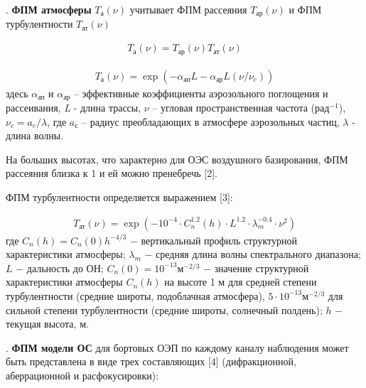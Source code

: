  . \textbf{ФПМ атмосферы} $T_\textit{а}(\nu)$ учитывает ФПМ рассеяния $T_\textit{ар}(\nu)$ и ФПМ турбулентности $T_\textit{ат}(\nu)$

\begin{equation}
	\label{eq:p2:fpm1}
	\begin{alignedat}{2}
		T_\textit{а}(\nu)=T_\textit{ар}(\nu)T_\textit{ат}(\nu)
	\end{alignedat}
\end{equation}

\begin{equation}
	\label{eq:p2:fpm2}
	\begin{alignedat}{2}
		T_\textit{а}(\nu)=\exp{ ( -\alpha_\textit{ап}L-\alpha_\textit{ар}L(\nu/\nu_c) ) }
	\end{alignedat}
\end{equation}
здесь  $\alpha_\textit{ап}$ и  $\alpha_\textit{ар}$ – эффективные коэффициенты аэрозольного поглощения и рассеивания, \textit{L}  - длина трассы, $\nu$ – угловая пространственная частота ($\textit{рад}^{-1}$), $\nu_c=a_{c}/\lambda$, где  $a_\textit{с}$ – радиус преобладающих в атмосфере аэрозольных частиц, $\lambda$ - длина волны.

На больших высотах, что характерно для ОЭС воздушного базирования, ФПМ рассеяния близка к 1 и ей можно пренебречь [2].

ФПМ турбулентности определяется выражением [3]:

\begin{equation}
	\label{eq:p2:fpm3}
	\begin{alignedat}{2}
		T_\textit{ат}(\nu)=\exp{ ( -10^{-4} \cdot C_n^{1.2}(h) \cdot L^{1.2} \cdot \lambda^{-0.4}_m \cdot \nu^2   ) }
	\end{alignedat}
\end{equation}
где $C_n(h)=C_n(0)h^{-4/3}$ − вертикальный профиль структурной характеристики атмосферы; 
$\lambda_m$ − средняя длина волны спектрального диапазона; 
$L$ − дальность до ОН; 
$C_n(0)=10^{-13} \textit{м}^{-2/3}$ − значение структурной характеристики атмосферы $C_n(h)$ на высоте 1 м для средней степени турбулентности (средние широты, подоблачная атмосфера), 
$5\cdot10^{-13} \textit{м}^{-2/3}$ для сильной степени турбулентности (средние широты, солнечный полдень); 
$h$ − текущая высота, м.


 . \textbf{ФПМ модели ОС} для бортовых ОЭП по каждому каналу наблюдения может быть представлена  в виде трех составляющих [4] (дифракционной, аберрационной и расфокусировки):

